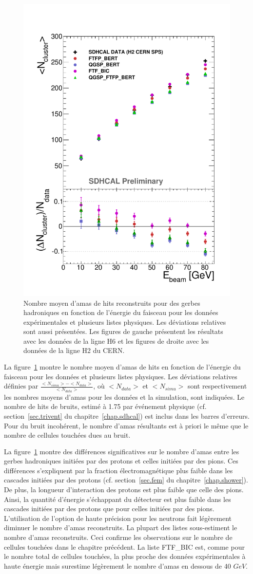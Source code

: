 \begin{figure}[!ht]
  \includegraphics[width=.45\textwidth]{Shower/figs/NCLUSTERPION_MODEL_NOV.pdf}
  \caption{Nombre moyen d'amas de hits reconstruits pour des gerbes hadroniques en fonction de l'énergie du faisceau pour les données expérimentales et plusieurs listes physiques. Les déviations relatives sont aussi présentées. Les figures de gauche présentent les résultats avec les données de la ligne H6 et les figures de droite avec les données de la ligne H2 du CERN.}
  \label{fig.cluster_pi-_ebeam}
\end{figure}
La figure~\ref{fig.cluster_pi-_ebeam} montre le nombre moyen d'amas de hits en fonction de l'énergie du faisceau pour les données et plusieurs listes physiques. Les déviations relatives définies par $\frac{<N_{simu}>-<N_{data}>}{<N_{data}>}$, où $<N_{data}>$ et $<N_{simu}>$ sont respectivement les nombres moyens d'amas pour les données et la simulation, sont indiquées. Le nombre de hits de bruits, estimé à 1.75 par événement physique (cf. section~\ref{sec.trivent} du chapitre~\ref{chap.sdhcal}) est inclus dans les barres d'erreurs. Pour du bruit incohérent, le nombre d'amas résultants est à priori le même que le nombre de cellules touchées dues au bruit. 

La figure~\ref{fig.cluster_pi-_ebeam} montre des différences significatives sur le nombre d'amas entre les gerbes hadroniques initiées par des protons et celles initiées par des pions. Ces différences s’expliquent par la fraction électromagnétique plus faible dans les cascades initiées par des protons (cf. section~\ref{sec.fem} du chapitre~\ref{chap.shower}). De plus, la longueur d'interaction des protons est plus faible que celle des pions. Ainsi, la quantité d'énergie s'échappant du détecteur est plus faible dans les cascades initiées par des protons que pour celles initiées par des pions. L'utilisation de l'option de haute précision pour les neutrons fait légèrement diminuer le nombre d'amas reconstruits. La plupart des listes sous-estiment le nombre d'amas reconstruits. Ceci confirme les observations sur le nombre de cellules touchées dans le chapitre précédent. La liste FTF\_BIC est, comme pour le nombre total de cellules touchées, la plus proche des données expérimentales à haute énergie mais surestime légèrement le nombre d'amas en dessous de 40 $GeV$. 

